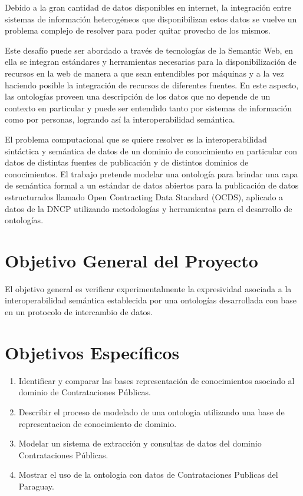 Debido a la gran cantidad de datos disponibles en internet, la integración entre sistemas de información heterogéneos que disponibilizan estos datos se vuelve un problema complejo de resolver para poder quitar provecho de los mismos. 

Este desafío puede ser abordado a través de tecnologías de la Semantic Web, en ella se integran estándares y herramientas necesarias para la disponibilización de recursos en la web de manera a que sean entendibles por máquinas y a la vez haciendo posible la integración de recursos de diferentes fuentes. En este aspecto, las ontologías proveen una descripción de los datos que no depende de un contexto en particular y puede ser entendido tanto por sistemas de información como por personas, logrando así la interoperabilidad semántica.

El problema computacional que se quiere resolver es la interoperabilidad sintáctica y semántica de datos de un dominio de conocimiento en particular con datos de distintas fuentes de publicación y de distintos dominios de conocimientos. El trabajo pretende modelar una ontología para brindar una capa de semántica formal a un estándar de datos abiertos para la publicación de datos estructurados llamado Open Contracting Data Standard (OCDS), aplicado a datos de la DNCP utilizando metodologías y herramientas para el desarrollo de ontologías. 


\section{Objetivo General del Proyecto}

El objetivo general es verificar experimentalmente la expresividad asociada a la interoperabilidad semántica establecida por una ontologías desarrollada con base en un protocolo de intercambio de datos.


\section{Objetivos Específicos}
\label{objetivos especiicos}

\begin{enumerate}
    \item \label{obj:1}  Identificar y comparar las bases representación de conocimientos asociado al dominio de Contrataciones Públicas.
    \item \label{obj:2}  Describir el proceso de modelado de una ontologia utilizando una base de representacion de conocimiento de dominio.
    \item \label{obj:3}  Modelar un sistema de extracción y consultas de datos del dominio Contrataciones Públicas.
    \item \label{obj:4}  Mostrar el uso de la ontologia con datos de Contrataciones Publicas del Paraguay.
\end{enumerate}



